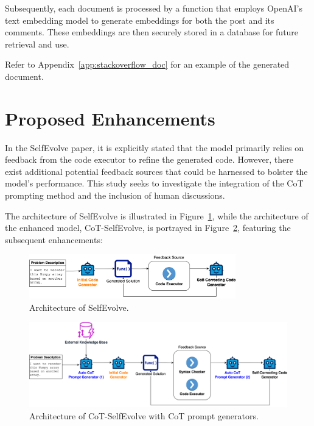 \documentclass[a4paper,oneside]{book}
\begin{document}
Subsequently, each document is processed by a function that employs OpenAI's text embedding model to generate embeddings for both the post and its comments. These embeddings are then securely stored in a database for future retrieval and use.

Refer to Appendix~\ref{app:stackoverflow_doc} for an example of the generated document.

\section{Proposed Enhancements}
In the SelfEvolve paper, it is explicitly stated that the model primarily relies on feedback from the code executor to refine the generated code. However, there exist additional potential feedback sources that could be harnessed to bolster the model's performance. This study seeks to investigate the integration of the CoT prompting method and the inclusion of human discussions.

The architecture of SelfEvolve is illustrated in Figure~\ref{fig:selfevolve_architecture}, while the architecture of the enhanced model, CoT-SelfEvolve, is portrayed in Figure~\ref{fig:cot_selfdebug_architecture}, featuring the subsequent enhancements:

\begin{figure}[H]
    \centering
    \includegraphics[width=0.8\textwidth]{img/selfevolve_architecture}
    \caption{Architecture of SelfEvolve.}\label{fig:selfevolve_architecture}
\end{figure}

\begin{figure}[H]
    \centering
    \includegraphics[width=1.0\textwidth]{img/cot_selfdebug_architecture}
    \caption{Architecture of CoT-SelfEvolve with CoT prompt generators.}\label{fig:cot_selfdebug_architecture}
\end{figure}
\end{document}
